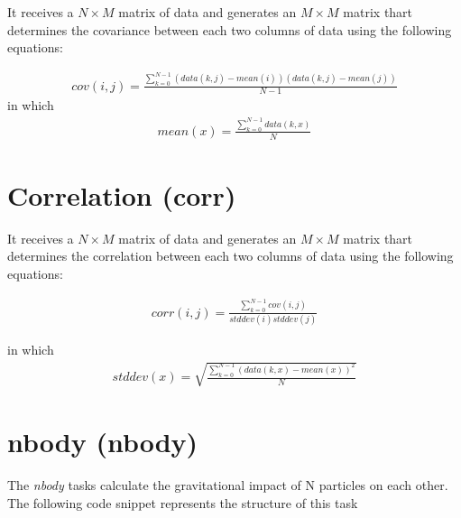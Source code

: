 \documentclass[]{report}
\begin{document}
It receives a $N\times M$ matrix of data and generates an $M\times M$ matrix thart determines the covariance between each two columns of data using the following equations:

\begin{align}
cov(i, j)=\frac{\sum_{k=0}^{N-1}{(data(k,j)-mean(i))(data(k,j)-mean(j))}}{N-1}
\end{align}
in which
\begin{align}
mean(x)=\frac{\sum_{k=0}^{N-1}{data(k,x)}}{N}
\end{align}

\section{Correlation (corr)\cite{PolyBench_manual}}

It receives a $N\times M$ matrix of data and generates an $M\times M$ matrix thart determines the correlation between each two columns of data using the following equations:

\begin{align}
corr(i, j)=\frac{\sum_{k=0}^{N-1}{cov(i, j)}}{stddev(i)stddev(j)}
\end{align}

in which
\begin{align}
stddev(x)=\sqrt{{\frac{\sum_{k=0}^{N-1}{(data(k,x)-mean(x))^2}}{N}}}
\end{align}



\section{nbody (nbody)}
The \textit{nbody}  tasks calculate the gravitational impact of N particles on each other.
The following code snippet represents the structure of this task
\end{document}
